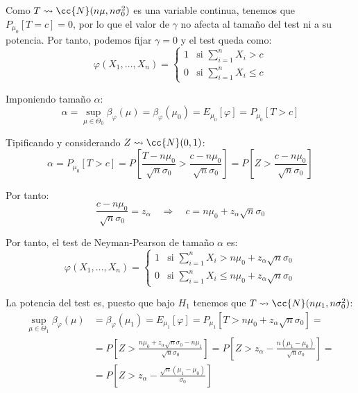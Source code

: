 \begin{ejercicio}
\begin{description}
        Como $T\rightsquigarrow \cc{N}(n\mu, n\sigma_0^2)$ es una variable continua, tenemos que $P_{\mu_0}[T=c]=0$, por lo que el valor de $\gamma$ no afecta al tamaño del test ni a su potencia. Por tanto, podemos fijar $\gamma=0$ y el test queda como:
        \begin{equation*}
            \varphi(X_1, \ldots, X_n) = \left\{\begin{array}{ll}
                1 & \text{si\ } \sum\limits_{i=1}^{n}X_i>c \\
                 0 & \text{si\ } \sum\limits_{i=1}^{n}X_i \leq c
            \end{array}\right.
        \end{equation*}


        Imponiendo tamaño $\alpha$:
        \begin{equation*}
            \alpha = \sup_{\mu \in \Theta_0}\beta_\varphi(\mu) = \beta_\varphi(\mu_0) = E_{\mu_0}[\varphi] = P_{\mu_0}[T > c]
        \end{equation*}

        Tipificando y considerando $Z\rightsquigarrow \cc{N}(0,1)$:
        \begin{equation*}
            \alpha = P_{\mu_0}[T > c] = P\left[\frac{T-n\mu_0}{\sqrt{n}\sigma_0} > \frac{c-n\mu_0}{\sqrt{n}\sigma_0}\right] = P\left[Z > \frac{c-n\mu_0}{\sqrt{n}\sigma_0}\right]
        \end{equation*}

        Por tanto:
        \begin{equation*}
            \frac{c-n\mu_0}{\sqrt{n}\sigma_0} = z_{\alpha} \quad\Longrightarrow\quad c = n\mu_0 + z_{\alpha}\sqrt{n}\sigma_0
        \end{equation*}

        Por tanto, el test de Neyman-Pearson de tamaño $\alpha$ es:
        \begin{equation*}
            \varphi(X_1, \ldots, X_n) = \left\{\begin{array}{ll}
                1 & \text{si\ } \sum\limits_{i=1}^{n}X_i>n\mu_0 + z_{\alpha}\sqrt{n}\sigma_0 \\
                 0 & \text{si\ } \sum\limits_{i=1}^{n}X_i \leq n\mu_0 + z_{\alpha}\sqrt{n}\sigma_0
            \end{array}\right. 
        \end{equation*}

        La potencia del test es, puesto que bajo $H_1$ tenemos que $T\rightsquigarrow \cc{N}(n\mu_1, n\sigma_0^2)$:
        \begin{align*}
            \sup_{\mu \in \Theta_1}\beta_\varphi(\mu) &= \beta_\varphi(\mu_1) = E_{\mu_1}[\varphi] = P_{\mu_1}[T > n\mu_0 + z_{\alpha}\sqrt{n}\sigma_0] =\\&= P\left[Z > \frac{n\mu_0 + z_{\alpha}\sqrt{n}\sigma_0 - n\mu_1}{\sqrt{n}\sigma_0}\right] = P\left[Z > z_{\alpha} - \frac{n(\mu_1-\mu_0)}{\sqrt{n}\sigma_0}\right] =\\&= P\left[Z > z_{\alpha} - \frac{\sqrt{n}(\mu_1-\mu_0)}{\sigma_0}\right]
        \end{align*}
        

\end{description}
\end{ejercicio}
